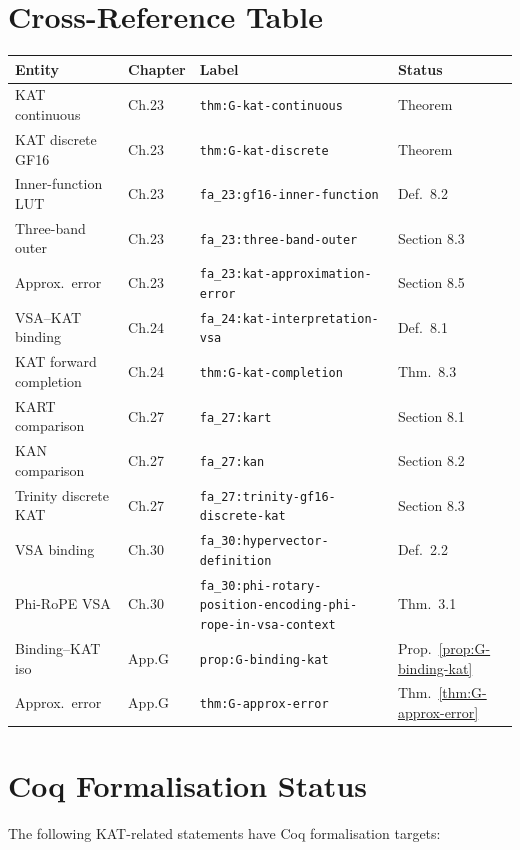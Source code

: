 \section{Cross-Reference Table}
\label{app:G-xref}

\begin{longtable}[]{@{}llll@{}}
\toprule\noalign{}
Entity & Chapter & Label & Status \\
\midrule\noalign{}
\endhead
\bottomrule\noalign{}
\endlastfoot
KAT continuous & Ch.23 & \texttt{thm:G-kat-continuous} & Theorem \\
KAT discrete GF16 & Ch.23 & \texttt{thm:G-kat-discrete} & Theorem \\
Inner-function LUT & Ch.23 & \texttt{fa\_23:gf16-inner-function} & Def.~8.2 \\
Three-band outer & Ch.23 & \texttt{fa\_23:three-band-outer} & Section 8.3 \\
Approx.\ error & Ch.23 & \texttt{fa\_23:kat-approximation-error} & Section 8.5 \\
VSA--KAT binding & Ch.24 & \texttt{fa\_24:kat-interpretation-vsa} & Def.~8.1 \\
KAT forward completion & Ch.24 & \texttt{thm:G-kat-completion} & Thm.~8.3 \\
KART comparison & Ch.27 & \texttt{fa\_27:kart} & Section 8.1 \\
KAN comparison & Ch.27 & \texttt{fa\_27:kan} & Section 8.2 \\
Trinity discrete KAT & Ch.27 & \texttt{fa\_27:trinity-gf16-discrete-kat} & Section 8.3 \\
VSA binding & Ch.30 & \texttt{fa\_30:hypervector-definition} & Def.~2.2 \\
Phi-RoPE VSA & Ch.30 & \texttt{fa\_30:phi-rotary-position-encoding-phi-rope-in-vsa-context} & Thm.~3.1 \\
Binding--KAT iso & App.G & \texttt{prop:G-binding-kat} & Prop.~\ref{prop:G-binding-kat} \\
Approx.\ error & App.G & \texttt{thm:G-approx-error} & Thm.~\ref{thm:G-approx-error} \\
\end{longtable}

\section{Coq Formalisation Status}
\label{app:G-coq-status}

The following KAT-related statements have Coq formalisation targets:

